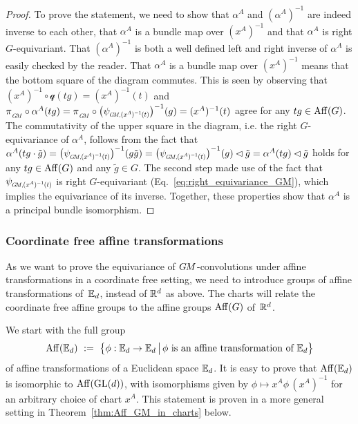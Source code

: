 \begin{proof}
    To prove the statement, we need to show that $\alpha^A$ and $(\alpha^A)^{-1}$ are indeed inverse to each other, that $\alpha^A$ is a bundle map over $(x^A)^{-1}$ and that $\alpha^A$ is right $G$-equivariant.
    That $(\alpha^A)^{-1}$ is both a well defined left and right inverse of $\alpha^A$ is easily checked by the reader.
    That $\alpha^A$ is a bundle map over $(x^A)^{-1}$ means that the bottom square of the diagram commutes.
    This is seen by observing that
    $(x^A)^{-1} \circ \mathscr{q} (tg) = (x^A)^{-1} (t)$ and
    $\piGM \circ \alpha^A (tg) = \piGM \circ \big(\psiGMxAinvt \big)^{-1}(g) = (x^A)^{-1} (t)$
    agree for any $tg \in \operatorname{Aff}(G)$.
    The commutativity of the upper square in the diagram, i.e. the right $G$-equivariance of $\alpha^A$, follows from the fact that
    $\alpha^A (tg \cdot \tilde{g}) = \big(\psiGMxAinvt \big)^{-1}(g \tilde{g}) = \big(\psiGMxAinvt \big)^{-1}(g) \lhd \tilde{g} = \alpha^A(tg) \lhd \tilde{g}$
    holds for any $tg\in \operatorname{Aff}(G)$ and any $\tilde{g} \in G$.
    The second step made use of the fact that $\psiGMxAinvt$ is right $G$-equivariant (Eq.~\eqref{eq:right_equivariance_GM}), which implies the equivariance of its inverse.
    Together, these properties show that $\alpha^A$ is a principal bundle isomorphism.
\end{proof}




\subsubsection{Coordinate free affine transformations}
As we want to prove the equivariance of $G\mkern-1.4muM$-convolutions under affine transformations in a coordinate free setting, we need to introduce groups of affine transformations of~$\mathbb{E}_d$, instead of $\mathbb{R}^d$ as above.
The charts will relate the coordinate free affine groups to the affine groups $\operatorname{Aff}(G)$ of~$\mathbb{R}^d$.

We start with the full group
\begin{align}\label{eq:AffE_def}
    \operatorname{Aff}(\mathbb{E}_d)\ :=\ \big\{ \phi: \mathbb{E}_d \to \mathbb{E}_d \,\big|\, \textup{$\phi$ is an affine transformation of $\mathbb{E}_d$} \big\}
\end{align}
of affine transformations of a Euclidean space $\mathbb{E}_d$.
It is easy to prove that $\operatorname{Aff}(\mathbb{E}_d)$ is isomorphic to $\operatorname{Aff}(\operatorname{GL}(d))$, with isomorphisms given by $\phi \mapsto x^A \phi\, (x^A)^{-1}$ for an arbitrary choice of chart $x^A$.
This statement is proven in a more general setting in Theorem~\ref{thm:Aff_GM_in_charts} below.

